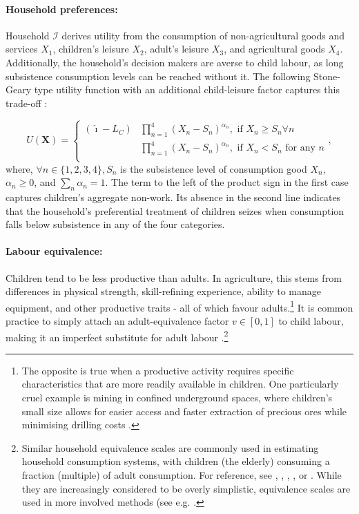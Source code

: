\documentclass[a4paper,12pt]{article}
\theoremstyle{plain}
\theoremstyle{definition}
\theoremstyle{definition}
\theoremstyle{definition}
\theoremstyle{definition}
\begin{document}
\paragraph{Household preferences:}

Household $\mathcal{I}$ derives utility from the consumption of non-agricultural goods and services $X_{1}$, children's leisure $X_2$, adult's leisure $X_{3}$, and agricultural goods $X_{4}$. Additionally, the household's decision makers are averse to child labour, as long subsistence consumption levels can be reached without it. The following Stone-Geary type utility function with an additional child-leisure factor captures this trade-off \citep[cf.][]{Basu1998}:

\begin{equation}
\label{eq:UF}
    U(\mathbf{X})=
    \begin{cases}
        (\hat{\imath}-L_C)&\prod_{n=1}^4 (X_n-S_n)^{\alpha_n}, \text{ if } X_n\geq S_n \forall n\\
        &\prod_{n=1}^4 (X_n-S_n)^{\alpha_n}, \text{ if } X_n<S_n \text{ for any } n\\
    \end{cases}
    ,
\end{equation}
where, $\forall n \in \{1,2,3,4\},S_n$ is the subsistence level of consumption good $X_n$, $\alpha_n\geq 0$, and $\sum_{n}\alpha_n=1$. The term to the left of the product sign in the first case captures children's aggregate non-work. Its absence in the second line indicates that the household's preferential treatment of children seizes when consumption falls below subsistence in any of the four categories.

\paragraph{Labour equivalence:} Children tend to be less productive than adults. In agriculture, this stems from differences in physical strength, skill-refining experience, ability to manage equipment, and other productive traits - all of which favour adults.\footnote{The opposite is true when a productive activity requires specific characteristics that are more readily available in children. One particularly cruel example is mining in confined underground spaces, where children's small size allows for easier access and faster extraction of precious ores while minimising drilling costs  \citep[see e.g.][]{Odriscoll2017}.} It is common practice to simply attach an adult-equivalence factor $v\in [0, 1]$ to child labour, making it an imperfect substitute for adult labour \citep{Basu1998, Baland2000, Bhalotra2003, Basu2010, Dwibedi2017, Dumas2020}.\footnote{Similar household equivalence scales are commonly used in estimating household consumption systems, with children (the elderly) consuming a fraction (multiple) of adult consumption. For reference, see \citet{Pollak1979}, \citet{Lewbel1989}, \citet{Blundell1994}, \citet{Lewbel1997}, or \citet{Deaton1999}. While they are increasingly considered to be overly simplistic, equivalence scales are used in more involved methods (see e.g. \citet{Dunbar2013}.} 
\end{document}
